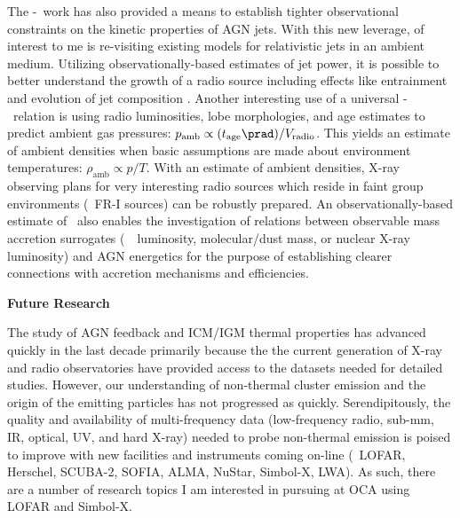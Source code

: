 \documentclass[11pt]{article}
\begin{document}
The \pjet-\prad\ work has also provided a means to establish tighter
observational constraints on the kinetic properties of AGN jets. With
this new leverage, of interest to me is re-visiting existing models
for relativistic jets in an ambient medium. Utilizing
observationally-based estimates of jet power, it is possible to better
understand the growth of a radio source including effects like
entrainment and evolution of jet composition \cite[\'a
  la][]{1999MNRAS.309.1017W}. Another interesting use of a universal
\pjet-\prad\ relation is using radio luminosities, lobe morphologies,
and age estimates to predict ambient gas pressures: $p_{\mathrm{amb}}
\propto (t_{\mathrm{age}}\prad) / V_{\mathrm{radio}}$. This yields an
estimate of ambient densities when basic assumptions are made about
environment temperatures: $\rho_{\mathrm{amb}} \propto p/T$. With an
estimate of ambient densities, X-ray observing plans for very
interesting radio sources which reside in faint group environments
(\ie\ FR-I sources) can be robustly prepared. An observationally-based
estimate of \pjet\ also enables the investigation of relations between
observable mass accretion surrogates (\ie\ \halpha\ luminosity,
molecular/dust mass, or nuclear X-ray luminosity) and AGN energetics
for the purpose of establishing clearer connections with accretion
mechanisms and efficiencies.

{\bf{Future Research}}


The study of AGN feedback and ICM/IGM thermal properties has advanced
quickly in the last decade primarily because the the current
generation of X-ray and radio observatories have provided access to
the datasets needed for detailed studies. However, our understanding
of non-thermal cluster emission and the origin of the emitting
particles has not progressed as quickly. Serendipitously, the quality
and availability of multi-frequency data (low-frequency radio, sub-mm,
IR, optical, UV, and hard X-ray) needed to probe non-thermal emission
is poised to improve with new facilities and instruments coming
on-line (\ie\ LOFAR, Herschel, SCUBA-2, SOFIA, ALMA, NuStar, Simbol-X,
LWA). As such, there are a number of research topics I am interested
in pursuing at OCA using LOFAR and Simbol-X.
\end{document}
